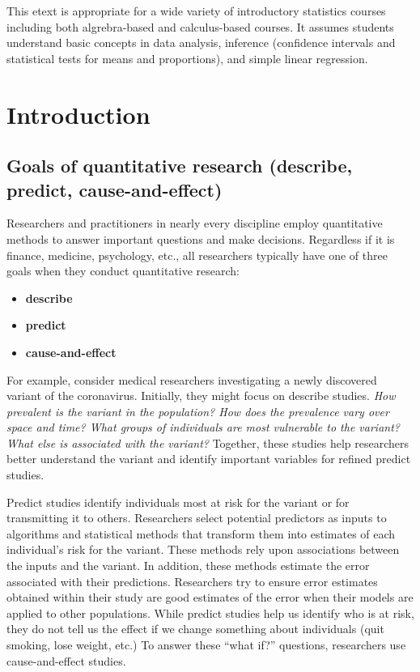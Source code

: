 \documentclass[
]{book}
\begin{document}
This etext is appropriate for a wide variety of introductory statistics courses including both algrebra-based and calculus-based courses. It assumes students understand basic concepts in data analysis, inference (confidence intervals and statistical tests for means and proportions), and simple linear regression.

\hypertarget{introduction}{%
\chapter{Introduction}\label{introduction}}

\hypertarget{goals-of-quantitative-research-describe-predict-cause-and-effect}{%
\section{Goals of quantitative research (describe, predict, cause-and-effect)}\label{goals-of-quantitative-research-describe-predict-cause-and-effect}}

Researchers and practitioners in nearly every discipline employ quantitative methods to answer important questions and make decisions. Regardless if it is finance, medicine, psychology, etc., all researchers typically have one of three goals \citep{cozby2020methods} when they conduct quantitative research:

\begin{itemize}
\item
  \textbf{describe}
\item
  \textbf{predict}
\item
  \textbf{cause-and-effect}
\end{itemize}

For example, consider medical researchers investigating a newly discovered variant of the coronavirus. Initially, they might focus on describe studies. \emph{How prevalent is the variant in the population? How does the prevalence vary over space and time? What groups of individuals are most vulnerable to the variant? What else is associated with the variant?} Together, these studies help researchers better understand the variant and identify important variables for refined predict studies.

Predict studies identify individuals most at risk for the variant or for transmitting it to others. Researchers select potential predictors as inputs to algorithms and statistical methods that transform them into estimates of each individual's risk for the variant. These methods rely upon associations between the inputs and the variant. In addition, these methods estimate the error associated with their predictions. Researchers try to ensure error estimates obtained within their study are good estimates of the error when their models are applied to other populations. While predict studies help us identify who is at risk, they do not tell us the effect if we change something about individuals (quit smoking, lose weight, etc.) To answer these ``what if?'' questions, researchers use cause-and-effect studies.
\end{document}
